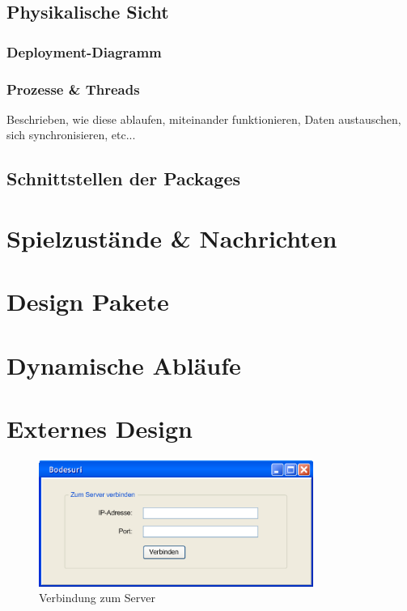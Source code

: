 \documentclass[a4paper,12pt,halfparskip,DIV14]{scrartcl}
\begin{document}

\clearpage
\subsection{Physikalische Sicht}

\subsubsection{Deployment-Diagramm}

\subsubsection{Prozesse \& Threads} %
\label{sub:prozesse_threads}
Beschrieben, wie diese ablaufen, miteinander funktionieren, Daten austauschen, sich synchronisieren, etc...

\clearpage
\subsection{Schnittstellen der Packages} %
\label{sub:schnittstellen_der_packages}

\clearpage
\section{Spielzustände \& Nachrichten} %
\label{spielzustaende_nachrichten}

\clearpage
\section{Design Pakete} %
\label{design_pakete}

\clearpage
\section{Dynamische Abläufe} %
\label{dynamische_ablauefe}

\clearpage
\section{Externes Design} %
\label{externes_design}

\begin{figure}[h]
	\centering
		\includegraphics[width=0.80\textwidth]{Externes Design - Verbindung.png}
		\caption{Verbindung zum Server}
	\label{fig:Externes Design - Verbindung}
\end{figure}
\end{document}
